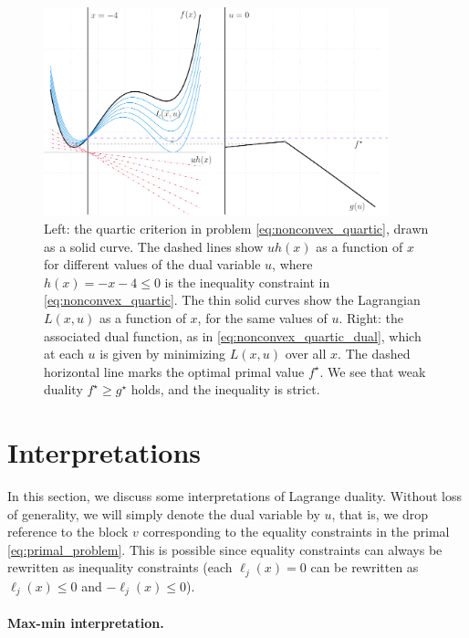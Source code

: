 \begin{figure}[tb]
\centering
\includegraphics[width=0.89\textwidth]{fig/nonconvex_quartic.pdf}
\caption{Left: the quartic criterion in problem \eqref{eq:nonconvex_quartic},
  drawn as a solid curve. The dashed lines show $uh(x)$ as a function of $x$ for
  different values of the dual variable $u$, where $h(x) = -x-4 \leq 0$ is the
  inequality constraint in \eqref{eq:nonconvex_quartic}. The thin solid curves
  show the Lagrangian $L(x,u)$ as a function of $x$, for the same values of
  $u$. Right: the associated dual function, as in
  \eqref{eq:nonconvex_quartic_dual}, which at each $u$ is given by minimizing 
  $L(x,u)$ over all $x$. The dashed horizontal line marks the optimal primal
  value $f^\star$. We see that weak duality $f^\star \geq g^\star$ holds, and
  the inequality is strict.}   
\label{fig:nonconvex_quartic}
\end{figure}

\section{Interpretations}
\label{sec:duality_interpretations}

In this section, we discuss some interpretations of Lagrange duality. Without
loss of generality, we will simply denote the dual variable by $u$, that is, we
drop reference to the block $v$ corresponding to the equality constraints in the
primal \eqref{eq:primal_problem}. This is possible since equality constraints
can always be rewritten as inequality constraints (each $\ell_j(x) = 0$ can be
rewritten as $\ell_j(x) \leq 0$ and $-\ell_j(x) \leq 0$). 

\paragraph{Max-min interpretation.}


